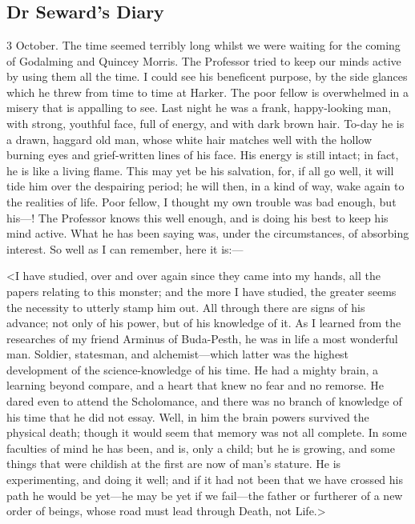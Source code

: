 \chapter[Chapter \thechapter]{}

\section{Dr Seward's Diary}

\begin{diary}{3 October.}
The time seemed terribly long whilst we were waiting for the coming of Godalming and Quincey Morris. The Professor tried to keep our minds active by using them all the time. I could see his beneficent purpose, by the side glances which he threw from time to time at Harker. The poor fellow is overwhelmed in a misery that is appalling to see. Last night he was a frank, happy-looking man, with strong, youthful face, full of energy, and with dark brown hair. To-day he is a drawn, haggard old man, whose white hair matches well with the hollow burning eyes and grief-written lines of his face. His energy is still intact; in fact, he is like a living flame. This may yet be his salvation, for, if all go well, it will tide him over the despairing period; he will then, in a kind of way, wake again to the realities of life. Poor fellow, I thought my own trouble was bad enough, but his—! The Professor knows this well enough, and is doing his best to keep his mind active. What he has been saying was, under the circumstances, of absorbing interest. So well as I can remember, here it is:—

<I have studied, over and over again since they came into my hands, all the papers relating to this monster; and the more I have studied, the greater seems the necessity to utterly stamp him out. All through there are signs of his advance; not only of his power, but of his knowledge of it. As I learned from the researches of my friend Arminus of Buda-Pesth, he was in life a most wonderful man. Soldier, statesman, and alchemist—which latter was the highest development of the science-knowledge of his time. He had a mighty brain, a learning beyond compare, and a heart that knew no fear and no remorse. He dared even to attend the Scholomance, and there was no branch of knowledge of his time that he did not essay. Well, in him the brain powers survived the physical death; though it would seem that memory was not all complete. In some faculties of mind he has been, and is, only a child; but he is growing, and some things that were childish at the first are now of man's stature. He is experimenting, and doing it well; and if it had not been that we have crossed his path he would be yet—he may be yet if we fail—the father or furtherer of a new order of beings, whose road must lead through Death, not Life.>


\end{diary}
